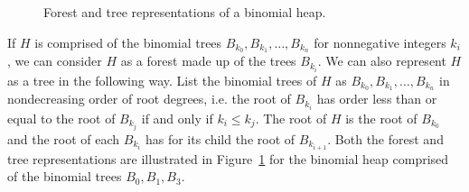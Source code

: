 \begin{figure}[!htbp]
\centering
{}
\qquad
{}
\caption{Forest and tree representations of a binomial heap.}
\label{fig:tree_data_structures:binomial_heap_forest_tree_representations}
\end{figure}

If $H$ is comprised of the binomial trees
$B_{k_0}, B_{k_1}, \dots, B_{k_n}$ for nonnegative integers $k_i$, we
can consider $H$ as a forest made up of the trees $B_{k_i}$. We can
also represent $H$ as a tree in the following way. List the binomial
trees of $H$ as $B_{k_0}, B_{k_1}, \dots, B_{k_n}$ in nondecreasing
order of root degrees, i.e. the root of $B_{k_i}$ has order less than
or equal to the root of $B_{k_j}$ if and only if $k_i \leq k_j$. The
root of $H$ is the root of $B_{k_0}$ and the root of each $B_{k_i}$
has for its child the root of $B_{k_{i+1}}$. Both the forest and tree
representations are illustrated in
Figure~\ref{fig:tree_data_structures:binomial_heap_forest_tree_representations}
for the binomial heap comprised of the binomial trees
$B_0, B_1, B_3$.

